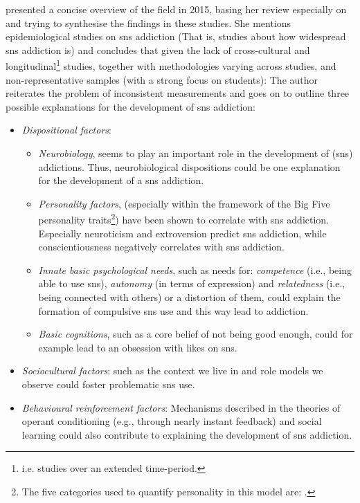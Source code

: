 \citet{andreassen_online_2015} presented a concise overview of the field in 2015, basing her review especially on \citep{andreassen_development_2012, kuss_internet_2014, andreassen_social_2014, ryan_uses_2014, kuss_internet_2014} and trying to synthesise the findings in these studies.
She mentions epidemiological studies on \gls{sns} addiction (That is, studies about how widespread \gls{sns} addiction is) and concludes that given the lack of cross-cultural and longitudinal\footnote{i.e. studies over an extended time-period.} studies, together with methodologies varying across studies, and non-representative samples (with a strong focus on students):  \citep{andreassen_social_2014}
The author reiterates the problem of inconsistent measurements and goes on to outline three possible explanations for the development of \gls{sns} addiction:
\begin{itemize}
    \item \textit{Dispositional factors}: \begin{itemize}
        \item \textit{Neurobiology}, seems to play an important role in the development of (\gls{sns}) addictions. Thus, neurobiological dispositions could be one explanation for the development of a \gls{sns} addiction.
        \item \textit{Personality factors}, (especially within the framework of the Big Five personality traits\footnote{The five categories used to quantify personality in this model are:  \citep{andreassen_online_2015}.}) have been shown to correlate with \gls{sns} addiction. Especially neuroticism and extroversion predict \gls{sns} addiction, while conscientiousness negatively correlates with \gls{sns} addiction.
        \item \textit{Innate basic psychological needs}, such as needs for: \emph{competence} (i.e., being able to use \gls{sns}), \emph{autonomy} (in terms of expression) and \emph{relatedness} (i.e., being connected with others) or a distortion of them, could explain the formation of compulsive \gls{sns} use and this way lead to addiction.
        \item \textit{Basic cognitions}, such as a core belief of not being good enough, could for example lead to an obsession with likes on \gls{sns}.
    \end{itemize}
    \item \textit{Sociocultural factors}: such as the context we live in and role models we observe could foster problematic \gls{sns} use.
    \item \textit{Behavioural reinforcement factors}: Mechanisms described in the theories of operant conditioning (e.g., through nearly instant feedback) and social learning could also contribute to explaining the development of \gls{sns} addiction.
\end{itemize}

